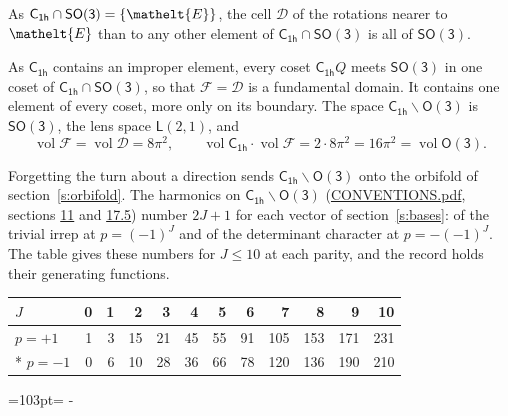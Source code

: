 \documentclass[10pt,a4paper]{article}
\newcommand{\needspace}[1]{\par\penalty-100\begingroup\dimen0=#1\relax\dimen2=\pagegoal
  \advance\dimen2-\pagetotal\ifdim\dimen0>\dimen2\relax\ifdim\dimen2>0pt\vfil\break\fi\fi
  \endgroup}
\numberwithin{equation}{section}
\newcommand{\eltfont}[1]{{\let\sigma\eltsigma\mathelt{#1}}}
\newcommand{\grp}[1]{\mathsf{#1}}
\newcommand{\elt}[1]{\eltfont{#1}}
\newcommand{\vol}{\operatorname{vol}}
\newcommand{\fcell}{\mathcal{D}}
\newcommand{\fdomain}{\mathcal{F}}
\newcommand{\lensspace}[2]{\mathsf{L}(#1, #2)}
\begin{document}
\leavevmode\label{n:set.cell}As $\grp{C_{1h}} \cap \grp{SO(3)} = \{\elt{E}\}$, the cell $\fcell$ of the rotations nearer to $\elt{E}$ than to any other element of $\grp{C_{1h}} \cap \grp{SO(3)}$ is all of \href{SO3.pdf}{$\grp{SO(3)}$}.

\leavevmode\label{n:set.fundamental}As $\grp{C_{1h}}$ contains an improper element, every coset $\grp{C_{1h}}Q$ meets \href{SO3.pdf}{$\grp{SO(3)}$} in one coset of $\grp{C_{1h}} \cap \grp{SO(3)}$, so that $\fdomain = \fcell$ is a fundamental domain. It contains one element of every coset, more only on its boundary.
\leavevmode\label{n:set.lens}The space $\grp{C_{1h}}\backslash\grp{O(3)}$ is \href{SO3.pdf}{$\grp{SO(3)}$}, the lens space $\lensspace{2}{1}$, and
\begin{equation}\label{e:volume}\vol\fdomain = \vol\fcell = 8\pi^2,\qquad \vol\grp{C_{1h}}\cdot\vol\fdomain = 2\cdot 8\pi^2 = 16\pi^2 = \vol\grp{O(3)}.\end{equation}

Forgetting the turn about a direction sends $\grp{C_{1h}}\backslash\grp{O(3)}$ onto the orbifold of section~\ref{s:orbifold}.
The harmonics on $\grp{C_{1h}}\backslash\grp{O(3)}$ (\href{../../CONVENTIONS.pdf}{CONVENTIONS.pdf}, sections \href{../../CONVENTIONS.pdf\#conv.11}{11} and \href{../../CONVENTIONS.pdf\#conv.17.5}{17.5}) number $2J + 1$ for each vector of section~\ref{s:bases}: of the trivial irrep at $p = (-1)^J$ and of the determinant character at $p = -(-1)^J$. The table gives these numbers for $J \le 10$ at each parity, and the record holds their generating functions.
{\small\setlength{\tabcolsep}{4pt}\begin{longtable}{@{}lrrrrrrrrrrr@{}}\toprule
$J$ & 0 & 1 & 2 & 3 & 4 & 5 & 6 & 7 & 8 & 9 & 10\\\midrule\endhead
\bottomrule\endfoot\endlastfoot
$p = +1$ & 1 & 3 & 15 & 21 & 45 & 55 & 91 & 105 & 153 & 171 & 231\\*
$p = -1$ & 0 & 6 & 10 & 28 & 36 & 66 & 78 & 120 & 136 & 190 & 210\\
\bottomrule\end{longtable}}
\needspace{103pt}
\end{document}
